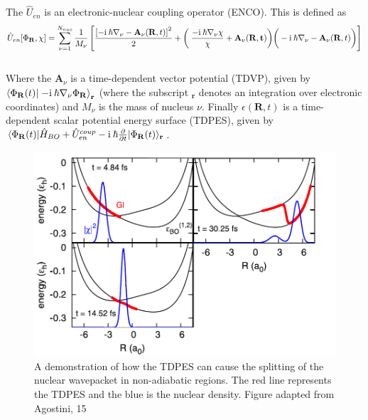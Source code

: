 The $\hat{U}_{en}$ is an electronic-nuclear coupling operator (ENCO). This is defined as \begin{equation}
  \hat{U}_{en}[\Phi_{\mathbf{R}}, \chi] = \sum_{\nu=1}^{N_{nuc}} \frac{1}{M_{\nu}} \left[ \frac{\left[-\mathrm{i} \: \hbar \nabla_{\nu} - \mathbf{A}_{\nu}(\mathbf{R}, t) \right]^2}{2} + \left( \left. \left. \frac{-\mathrm{i} \: \hbar \nabla_{\nu} \chi}{\chi} + \mathbf{A}_{\nu}(\mathbf{R, t})\right)\right( -\mathrm{i} \: \hbar\nabla_{\nu} -            \mathbf{A}_{\nu}(\mathbf{R}, t)\right) \right]
  \label{eq:ENCO}
\end{equation}
\\
Where the $\mathbf{A}_{\nu}$ is a time-dependent vector potential (TDVP), given by $\left\langle \Phi_{\mathbf{R}}(t) \right\vert \left. - \mathrm{i} \: \hbar \nabla_{\nu} \Phi_{\mathbf{R}} \right\rangle_{\mathbf{r}}$ (where the subscript $_{\mathbf{r}}$ denotes an integration over electronic coordinates) and $M_{\nu}$ is the mass of nucleus $\nu$.
Finally $\epsilon(\mathbf{R}, t)$ is a time-dependent scalar potential energy surface (TDPES), given by $\langle \Phi_{\mathbf{R}}(t) \vert \hat{H}_{BO} + \hat{U}_{en}^{coup} - \mathrm{i} \: \hbar \frac{\partial}{\partial t} \vert \Phi_{\mathbf{R}}(t) \rangle_{\mathbf{r}}$.
\\
\begin{figure}[htp]
  \includegraphics[width=\textwidth]{../img/CTMQC/nuclear_splitting_TDPES.png}
  \caption{A demonstration of how the TDPES can cause the splitting of the nuclear wavepacket in non-adiabatic regions. The red line represents the TDPES and the blue is the nuclear density. Figure adapted from Agostini, 15 \cite{agostini_exact_2015} \label{fig:step_TDPES}}
\end{figure}
